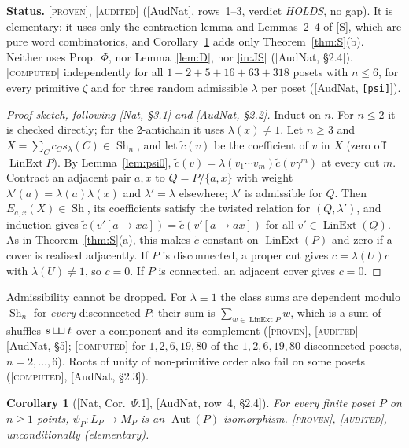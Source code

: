 \documentclass[11pt]{article}
\newtheorem{corollary}[theorem]{Corollary}
\theoremstyle{definition}
\theoremstyle{remark}
\newcommand{\Lin}{\operatorname{LinExt}}
\newcommand{\Aut}{\operatorname{Aut}}
\newcommand{\Sh}{\operatorname{Sh}}
\newcommand{\shuf}{\mathbin{\sqcup\mkern-3mu\sqcup}}
\newcommand{\st}[1]{\textup{[\textsc{#1}]}}
\begin{document}
\noindent\textbf{Status.} \st{proven}, \st{audited} ([AudNat], rows~1--3,
verdict \emph{HOLDS}, no gap). It is elementary: it uses only the
contraction lemma and Lemmas~2--4 of [S], which are pure word
combinatorics, and Corollary~\ref{cor:psi} adds only Theorem~\ref{thm:S}(b).
Neither uses Prop.~$\Phi$, nor
Lemma~\ref{lem:D}, nor \ref{in:JS} ([AudNat, \S2.4]). \st{computed}
independently for all $1+2+5+16+63+318$ posets with $n\le6$, for every
primitive $\zeta$ and for three random admissible $\lambda$ per poset
([AudNat, \texttt{[psi]}]).

\begin{proof}[Proof sketch, following {[Nat, \S3.1]} and {[AudNat, \S2.2]}]
Induct on $n$. For $n\le2$ it is checked directly; for the $2$-antichain it
uses $\lambda(x)\ne1$. Let $n\ge3$ and $X=\sum_Cc_Cs_\lambda(C)\in\Sh_n$, and
let $\tilde c(v)$ be the coefficient of $v$ in $X$ (zero off $\Lin P$). By
Lemma~\ref{lem:psi0}, $\tilde c(v)=\lambda(v_1\cdots v_m)\tilde c(v\gamma^m)$
at every cut $m$. Contract an adjacent pair $a,x$ to $Q=P/\{a,x\}$ with
weight $\lambda'(a)=\lambda(a)\lambda(x)$ and $\lambda'=\lambda$ elsewhere;
$\lambda'$ is admissible for $Q$. Then $E_{a,x}(X)\in\Sh$, its coefficients
satisfy the twisted relation for $(Q,\lambda')$, and induction gives
$\tilde c(v'[a\to xa])=\tilde c(v'[a\to ax])$ for all $v'\in\Lin(Q)$. As in
Theorem~\ref{thm:S}(a), this makes $\tilde c$ constant on $\Lin(P)$ and zero
if a cover is realised adjacently. If $P$ is disconnected, a proper cut
gives $c=\lambda(U)c$ with $\lambda(U)\ne1$, so $c=0$. If $P$ is connected,
an adjacent cover gives $c=0$.
\end{proof}

Admissibility cannot be dropped. For $\lambda\equiv1$ the class sums are
dependent modulo $\Sh_n$ for \emph{every} disconnected $P$: their sum is
$\sum_{w\in\Lin P}w$, which is a sum of shuffles $s\shuf t$ over a component
and its complement (\st{proven}, \st{audited} [AudNat, \S5]; \st{computed}
for $1,2,6,19,80$ of the $1,2,6,19,80$ disconnected posets, $n=2,\dots,6$).
Roots of unity of non-primitive order also fail on some posets
(\st{computed}, [AudNat, \S2.3]).

\begin{corollary}[{[Nat, Cor.~$\Psi$.1]}, {[AudNat, row~4, \S2.4]}]\label{cor:psi}
For every finite poset $P$ on $n\ge1$ points, $\psi_P:L_P\to M_P$ is an $\Aut(P)$-isomorphism.
\st{proven}, \st{audited}, unconditionally (elementary).
\end{corollary}
\end{document}
